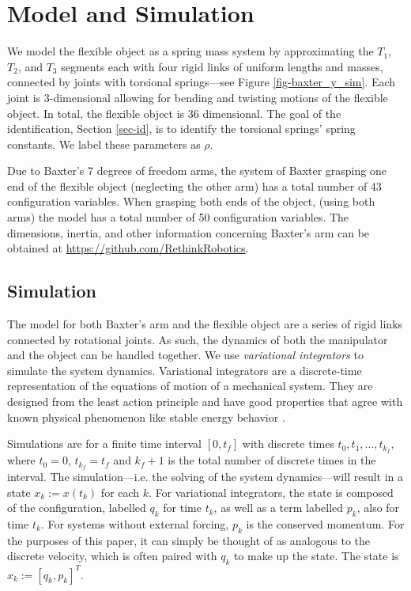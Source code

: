 \documentclass[runningheads,a4paper]{llncs}
\begin{document}
\section{Model and Simulation \label{sec-sim}}
\label{sec-sim}
We model the flexible object as a spring mass system by approximating the $T_1$, $T_2$, and $T_3$ segments each with four rigid links of uniform lengths and masses, connected by joints with torsional springs---see Figure \ref{fig-baxter_y_sim}. Each joint is 3-dimensional allowing for bending and twisting motions of the flexible object. In total, the flexible object is 36 dimensional. The goal of the identification, Section \ref{sec-id}, is to identify the torsional springs' spring constants. We label these parameters as $\rho$.

Due to Baxter's 7 degrees of freedom arms, the system of Baxter grasping one end of the flexible object (neglecting the other arm) has a total number of 43 configuration variables. When grasping both ends of the object, (using both arms) the model has a total number of 50 configuration variables. The dimensions, inertia, and other information concerning Baxter's arm can be obtained at \url{https://github.com/RethinkRobotics}.  

\subsection{Simulation}
The model for both Baxter's arm and the flexible object are a series of rigid links connected by rotational joints. As such, the dynamics of both the manipulator and the object can be handled together. We use \emph{variational integrators} to simulate the system dynamics.   Variational integrators are a discrete-time representation of the equations of motion of a mechanical system.  They are designed from the least action principle and have good properties that agree with known physical phenomenon like stable energy behavior \cite{pekarek_murphey}.  

Simulations are for a finite time interval $[0,t_f]$ with discrete times $t_0,t_1,\ldots,t_{k_f}$, where $t_0 = 0$, $t_{k_f} = t_f$ and $k_f+1$ is the total number of discrete times in the interval. The simulation---i.e. the solving of the system dynamics---will result in a state $x_k:=x(t_k)$ for each $k$.  For variational integrators, the state is composed of the configuration, labelled $q_k$ for time $t_k$, as well as a term labelled $p_k$, also for time $t_k$. For systems without external forcing, $p_k$ is the conserved momentum.  For the purposes of this paper, it can simply be thought of as analogous to the discrete velocity, which is often paired with $q_k$ to make up the state.  The state is $x_k:=[q_k,p_k]^T$. 
\end{document}
